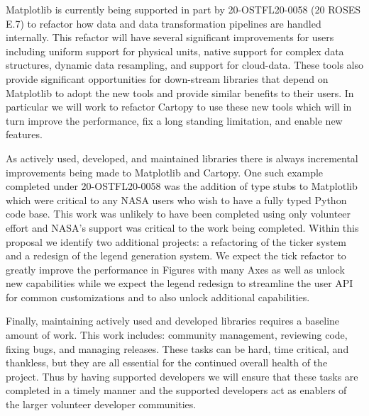 \documentclass[12pt]{article}
\numberwithin{page}{section}
\begin{document}
Matplotlib is currently being supported in part by 20-OSTFL20-0058 (20 ROSES
E.7) to refactor how data and data transformation pipelines are handled
internally.  This refactor will have several significant improvements for users
including uniform support for physical units, native support for complex data
structures, dynamic data resampling, and support for cloud-data.  These tools
also provide significant opportunities for down-stream libraries that depend on
Matplotlib to adopt the new tools and provide similar benefits to their users.
In particular we will work to refactor Cartopy to use these new tools which will in
turn improve the performance, fix a long standing limitation, and
enable new features.

As actively used, developed, and maintained libraries there is always
incremental improvements being made to Matplotlib and Cartopy.  One such
example completed under 20-OSTFL20-0058 was the addition of type stubs to
Matplotlib which were critical to any NASA users who wish to have a fully typed
Python code base.  This work was unlikely to have been completed using only
volunteer effort and NASA's support was critical to the work being completed.
Within this proposal we identify two additional projects: a refactoring of the
ticker system and a redesign of the legend generation system.  We expect the
tick refactor to greatly improve the performance in Figures with many Axes as
well as unlock new capabilities while we expect the legend redesign to streamline
the user API for common customizations and to also unlock additional capabilities.

Finally, maintaining actively used and developed libraries requires a baseline
amount of work.  This work includes: community management, reviewing code,
fixing bugs, and managing releases.  These tasks can be hard, time critical,
and thankless, but they are all essential for the continued overall health of the
project.  Thus by having supported developers we will ensure that these tasks
are completed in a timely manner and the supported developers act as enablers
of the larger volunteer developer communities.




\end{document}
